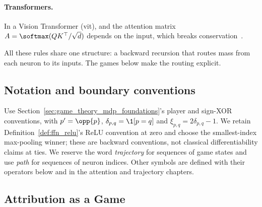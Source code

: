 \paragraph{Transformers.} In a Vision Transformer (\acs{vit}),  and the attention matrix $A = \softmax(QK^\top/\sqrt{d})$
depends on the input, which breaks conservation~\parencite{Ali2022AttnLRP}.

All these rules share one structure: a backward recursion that routes mass from each neuron to its
inputs. The games below make the routing explicit.

\subsection{Notation and boundary conventions}\label{ptnb:app:notation}\label{ptnb:app:notation-identities}
Use Section~\ref{sec:game_theory_mdp_foundations}'s player and sign-XOR conventions, with $p'=\opp{p}$,
$\delta_{p,q}=\1[p=q]$ and $\xi_{p,q}=2\delta_{p,q}-1$.
We retain Definition~\ref{def:ffn_relu}'s ReLU convention at zero and choose the smallest-index max-pooling
winner; these are backward conventions, not classical differentiability claims at ties.
We reserve the word \emph{trajectory} for sequences of game states and use \emph{path} for sequences of neuron indices.
Other symbols are defined with their operators below and in the attention and trajectory chapters.

\subsection{Attribution as a Game}\label{ptnb:sec:game}

